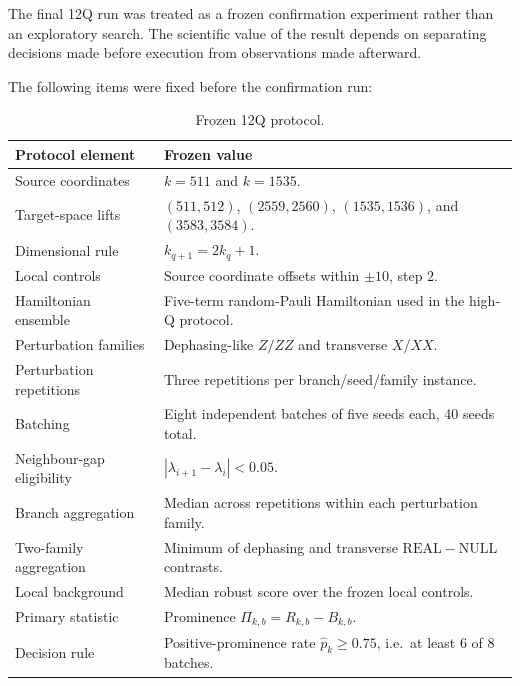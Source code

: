 \documentclass[11pt,a4paper]{article}
\newcommand{\Real}{\mathrm{REAL}}
\newcommand{\Null}{\mathrm{NULL}}
\newcommand{\Prom}{\Pi}
\begin{document}
The final 12Q run was treated as a frozen confirmation experiment rather than
an exploratory search.  The scientific value of the result depends on
separating decisions made before execution from observations made afterward.

The following items were fixed before the confirmation run:

\begin{table}[H]
\centering
\caption{Frozen 12Q protocol.}
\begin{tabular}{@{}p{}p{}@{}}
\toprule
Protocol element & Frozen value\\
\midrule
Source coordinates &
\(k=511\) and \(k=1535\).\\

Target-space lifts &
\((511,512)\), \((2559,2560)\), \((1535,1536)\), and
\((3583,3584)\).\\

Dimensional rule &
\(k_{q+1}=2k_q+1\).\\

Local controls &
Source coordinate offsets within \(\pm10\), step \(2\).\\

Hamiltonian ensemble &
Five-term random-Pauli Hamiltonian used in the high-Q protocol.\\

Perturbation families &
Dephasing-like \(Z/ZZ\) and transverse \(X/XX\).\\

Perturbation repetitions &
Three repetitions per branch/seed/family instance.\\

Batching &
Eight independent batches of five seeds each, 40 seeds total.\\

Neighbour-gap eligibility &
\(|\lambda_{i+1}-\lambda_i|<0.05\).\\

Branch aggregation &
Median across repetitions within each perturbation family.\\

Two-family aggregation &
Minimum of dephasing and transverse \(\Real-\Null\) contrasts.\\

Local background &
Median robust score over the frozen local controls.\\

Primary statistic &
Prominence
\(\Prom_{k,b}=R_{k,b}-B_{k,b}\).\\

Decision rule &
Positive-prominence rate
\(\widehat p_k\ge0.75\), i.e.\ at least 6 of 8 batches.\\
\bottomrule
\end{tabular}
\end{table}
\end{document}
